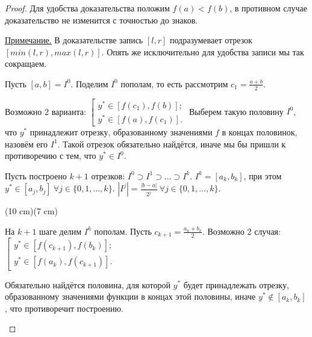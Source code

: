 \begin{proof}

    Для удобства доказательства положим $f (a) < f (b)$, в противном случае доказательство не изменится с точностью до знаков.

    \underline{Примечание.} В доказательстве запись $[l, r]$ подразумевает отрезок $[min(l, r), max(l, r)]$. Опять же исключительно для удобства записи мы так сокращаем.

    Пусть $[a, b] = I^{0}$. Поделим $I^{0}$ пополам, то есть рассмотрим $c_{1} = \frac{a + b}{2}$. 
    
    Возможно 2 варианта: $
    \left[
    \begin{gathered}
        y^{*} \in [f (c_{1}), f (b)];\\
        y^{*} \in [f (a), f (c_{1})].
    \end{gathered}
    \right.
    $
    Выберем такую половину $I^{0}$, что $y^{*}$ принадлежит отрезку, образованному значениями $f$ в концах половинок, назовём его $I^{1}$. Такой отрезок обязательно найдётся, иначе мы бы пришли к противоречию с тем, что $y^{*} \in I^{0}$.

    Пусть построено $k + 1$ отрезков: $I^{0} \supset I^{1} \supset \ldots \supset I^{k}$. $I^{k} = [a_{k}, b_{k}]$, при этом $y^{*} \in [a_{j}, b_{j}] \  \forall j \in \{0, 1, \ldots, k\}$.
    $|I^{j}| = \frac{|b - a|}{2^{j}} \  \forall j \in \{ 0, 1, \ldots, k\}$. 
    
    
\sidefig(10 cm)(7 cm)
{
\begin{flushleft}
    На $k + 1$ шаге делим $I^{k}$ пополам. Пусть $c_{k + 1} = \frac{a_{k} + b_{k}}{2}$. Возможно 2 случая: $
    \left[
    \begin{gathered}
        y^{*} \in [f (c_{k + 1}), f (b_{k})];\\
        y^{*} \in [f (a_{k}), f (c_{k + 1})].
    \end{gathered}
    \right.
    $

     Обязательно найдётся половина, для которой $y^{*}$ будет принадлежать отрезку, образованному значениями функции в концах этой половины, иначе $y^{*} \notin [a_{k}, b_{k}]$, что противоречит построению.
\end{flushleft}
}
{
    }
\end{proof}
